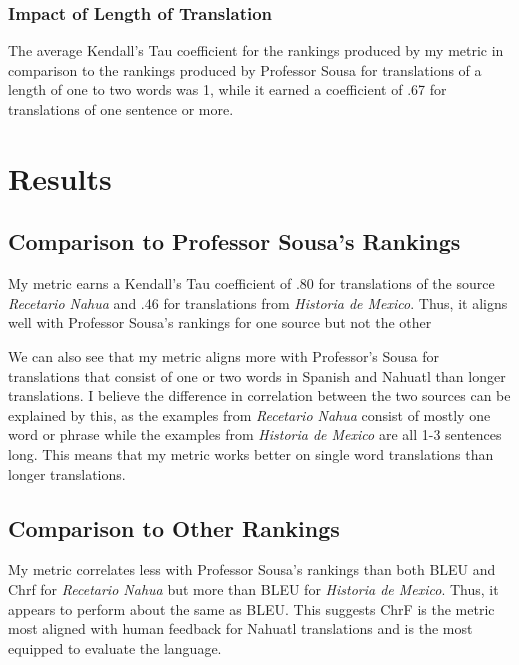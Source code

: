 \documentclass[10pt,twocolumn]{article}
\begin{document}
\subsubsection{Impact of Length of Translation}

The average Kendall's Tau coefficient for the rankings produced by my metric in comparison to the rankings produced by Professor Sousa for translations of a length of one to two words was 1, while it earned a coefficient of .67 for translations of one sentence or more.

\section{Results}
\subsection{Comparison to Professor Sousa's Rankings}
My metric earns a Kendall's Tau coefficient of .80 for translations of the source \textit{Recetario Nahua} and .46 for translations from \textit{Historia de Mexico}. Thus, it aligns well with Professor Sousa's rankings for one source but not the other

We can also see that my metric aligns more with Professor's Sousa for translations that consist of one or two words in Spanish and Nahuatl than longer translations. I believe the difference in correlation between the two sources can be explained by this, as the examples from \textit{Recetario Nahua} consist of mostly one word or phrase while the examples from \textit{Historia de Mexico} are all 1-3 sentences long. This means that my metric works better on single word translations than longer translations. 

\subsection{Comparison to Other Rankings}
My metric correlates less with Professor Sousa's rankings than both BLEU and Chrf for \textit{Recetario Nahua} but more than BLEU for \textit{Historia de Mexico}. Thus, it appears to perform about the same as BLEU. This suggests ChrF is the metric most aligned with human feedback for Nahuatl translations and is the most equipped to evaluate the language.
\end{document}
